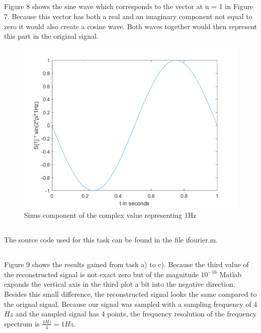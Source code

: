 \documentclass[12pt,a4paper]{article}
\begin{document}
\subsection{}
Figure 8 shows the sine wave which corresponds to the vector at u = 1 in Figure 7. Because this vector has both a real and an imaginary component not equal to zero it would also create a cosine wave. Both waves together would then represent this part in the original signal.
\begin{figure}[h]
	\begin{center}
		\includegraphics[scale=1.0]{./images/Sinus.png}
		\caption{Sinus component of the complex value representing 1Hz} 
	\end{center}
\end{figure}

\subsection{}
The source code used for this task can be found in the file ifourier.m.

\subsection{}
Figure 9 shows the results gained from task a) to c). Because the third value of the reconstructed signal is not exact zero but of the magnitude $10^{-16}$ Matlab expands the vertical axis in the third plot a bit into the negative direction. Besides this small difference, the reconstructed signal looks the same compared to the orignal signal. Because our signal was sampled with a sampling frequency of 4$\si{Hz}$ and the sampled signal has 4 points, the frequency resolution of the frequency spectrum is $\frac{4\si{Hz}}{4} = 1\si{Hz}$.
\end{document}

